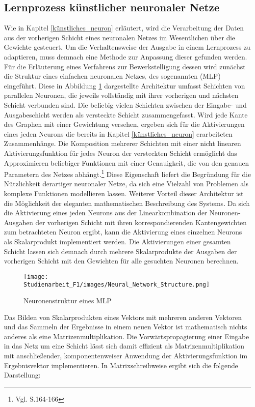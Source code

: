 \subsection{Lernprozess künstlicher neuronaler Netze}\label{lernprozess}
Wie in Kapitel \ref{künstliches_neuron} erläutert, wird die Verarbeitung der Daten aus der vorherigen Schicht eines neuronalen Netzes im Wesentlichen über die Gewichte gesteuert. Um die Verhaltensweise der Ausgabe in einem Lernprozess zu adaptieren, muss demnach eine Methode zur Anpassung dieser gefunden werden. Für die Erläuterung eines Verfahrens zur Bewerkstelligung dessen wird zunächst die Struktur eines einfachen neuronalen Netzes, des sogenannten  (MLP) eingeführt. Diese in Abbildung \ref{fig:MLP_structure} dargestellte Architektur umfasst Schichten von parallelen Neuronen, die jeweils vollständig mit ihrer vorherigen und nächsten Schicht verbunden sind. Die beliebig vielen Schichten zwischen der Eingabe- und Ausgabeschicht werden als versteckte Schicht zusammengefasst. Wird jede Kante des Graphen mit einer Gewichtung versehen, ergeben sich für die Aktivierungen eines jeden Neurons die bereits in Kapitel \ref{künstliches_neuron} erarbeiteten Zusammenhänge. Die Komposition mehrerer Schichten mit einer nicht linearen Aktivierungsfunktion für jedes Neuron der versteckten Schicht ermöglicht das Approximieren beliebiger Funktionen mit einer Genauigkeit, die von den genauen Parametern des Netzes abhängt.\footnote{Vgl. \cite{goodfellow_deep_learning} S.164-166} Diese Eigenschaft liefert die Begründung für die Nützlichkeit derartiger neuronaler Netze, da sich eine Vielzahl von Problemen als komplexe Funktionen modellieren lassen. Weiterer Vorteil dieser Architektur ist die Möglichkeit der eleganten mathematischen Beschreibung des Systems. Da sich die Aktivierung eines jeden Neurons aus der Linearkombination der Neuronen-Ausgaben der vorherigen Schicht mit ihren korrespondierenden Kantengewichten zum betrachteten Neuron ergibt, kann die Aktivierung eines einzelnen Neurons als Skalarprodukt implementiert werden. Die Aktivierungen einer gesamten Schicht lassen sich demnach durch mehrere Skalarprodukte der Ausgaben der vorherigen Schicht mit den Gewichten für alle gesuchten Neuronen berechnen. 
\begin{figure}[h]
    \centering
    \texttt{[image: Studienarbeit\_F1/images/Neural\_Network\_Structure.png]}
    \caption{Neuronenstruktur eines MLP}
    \label{fig:MLP_structure}
\end{figure}
Das Bilden von Skalarprodukten eines Vektors mit mehreren anderen Vektoren und das Sammeln der Ergebnisse in einem neuen Vektor ist mathematisch nichts anderes als eine Matrizenmultiplikation. Die Vorwärtspropagierung einer Eingabe in das Netz um eine Schicht lässt sich damit effizient als Matrizenmultiplikation mit anschließender, komponentenweiser Anwendung der Aktivierungsfunktion im Ergebnisvektor implementieren. In Matrixschreibweise ergibt sich die folgende Darstellung:
